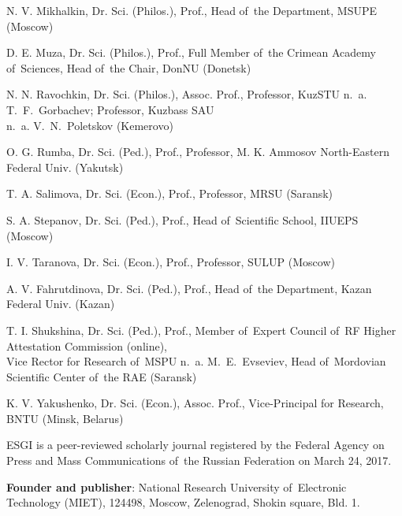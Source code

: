 \begin{otherlanguage}{english}
\begin{multicols}{2}
\begin{flushleft}
\noindent N. V. Mikhalkin, Dr. Sci. (Philos.), Prof., Head of the Department, MSUPE (Moscow)

\noindent D. E. Muza, Dr. Sci. (Philos.), Prof., Full Member of the Crimean Academy of Sciences, Head of the Chair, DonNU (Donetsk)

\noindent N. N. Ravochkin, Dr. Sci. (Philos.), Assoc. Prof., Professor, KuzSTU n. a. T. F. Gorbachev; Professor, Kuzbass SAU\\ n. a. V. N. Poletskov (Kemerovo)

\noindent O. G. Rumba, Dr. Sci. (Ped.), Prof., Professor, M. K. Ammosov North-Eastern Federal Univ. (Yakutsk)

\noindent T. A. Salimova, Dr. Sci. (Econ.), Prof., Professor, MRSU (Saransk)

\noindent S. A. Stepanov, Dr. Sci. (Ped.), Prof., Head of Scientific School, IIUEPS (Moscow)

\noindent I. V. Taranova, Dr. Sci. (Econ.), Prof., Professor, SULUP (Moscow)

\noindent A. V. Fahrutdinova, Dr. Sci. (Ped.), Prof., Head of the Department, Kazan Federal Univ. (Kazan)

\noindent T. I. Shukshina, Dr. Sci. (Ped.), Prof., Member of Expert Council of RF Higher Attestation Commission (online),\\ Vice Rector for Research of MSPU n. a. M. E. Evseviev, Head of Mordovian Scientific Center of the RAE (Saransk)

\noindent K. V. Yakushenko, Dr. Sci. (Econ.), Assoc. Prof., Vice-Principal for Research, BNTU (Minsk, Belarus)

   \end{flushleft}    
\end{multicols}

\begin{flushleft}
\scriptsize
ESGI is a peer-reviewed scholarly journal registered by the Federal Agency on Press and Mass Communications
of the Russian Federation on March 24, 2017.

\vspace{1em}
\textbf{Founder and publisher}: National Research University of Electronic Technology (MIET), 124498, Moscow,
Zelenograd, Shokin square, Bld. 1.
\end{flushleft}

\noindent
\begin{minipage}[t]{.48\textwidth}
    

\end{minipage}
\end{otherlanguage}
